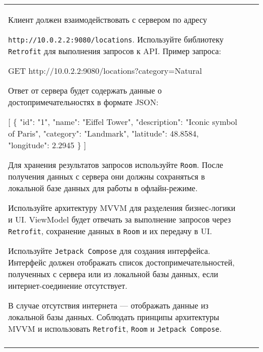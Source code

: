 \documentclass[a4paper]{article}
\begin{document}
\begin{tabular}{!{\vrule width 2pt}p{5cm}|p{6cm}|p{4cm}!{\vrule width 2pt}}
{\begin{minipage}{16cm}
\begin{enumerate}
Клиент должен взаимодействовать с сервером по адресу 

\texttt{http://10.0.2.2:9080/locations}. Используйте библиотеку \texttt{Retrofit} для выполнения запросов к API. Пример запроса:


GET http://10.0.2.2:9080/locations?category=Natural


Ответ от сервера будет содержать данные о достопримечательностях в формате JSON:


[
  \{
    "id": "1",
    "name": "Eiffel Tower",
    "description": "Iconic symbol of Paris",
    "category": "Landmark",
    "latitude": 48.8584,
    "longitude": 2.2945
  \}
]


Для хранения результатов запросов используйте \texttt{Room}. После получения данных с сервера они должны сохраняться в локальной базе данных для работы в офлайн-режиме.

Используйте архитектуру MVVM для разделения бизнес-логики и UI. ViewModel будет отвечать за выполнение запросов через \texttt{Retrofit}, сохранение данных в \texttt{Room} и их передачу в UI.

Используйте \texttt{Jetpack Compose} для создания интерфейса. Интерфейс должен отображать список достопримечательностей, полученных с сервера или из локальной базы данных, если интернет-соединение отсутствует.

В случае отсутствия интернета — отображать данные из локальной базы данных.
Соблюдать принципы архитектуры MVVM и использовать \texttt{Retrofit}, \texttt{Room} и \texttt{Jetpack Compose}. 
\end{enumerate}

\vspace{0.2cm}
    
\end{minipage}
}
\\
\end{tabular}
\end{document}
